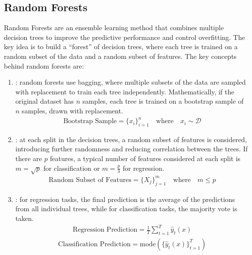 \documentclass[letterpaper,10pt,english]{jupyterBook}
\begin{document}
\subsection{Random Forests}
\label{\detokenize{notebooks/review_ML:random-forests}}
\sphinxAtStartPar
Random Forests are an ensemble learning method that combines multiple decision trees to improve the predictive performance and control overfitting. The key idea is to build a “forest” of decision trees, where each tree is trained on a random subset of the data and a random subset of features. The key concepts behind random forests are:
\begin{enumerate}
%
\item {} 
\sphinxAtStartPar
{}: random forests use bagging, where multiple subsets of the data are sampled with replacement to train each tree independently. Mathematically, if the original dataset has \(n\) samples, each tree is trained on a bootstrap sample of \(n\) samples, drawn with replacement.
\begin{equation*}
\begin{split}
   \text{Bootstrap Sample} = \{ x_i \}_{i=1}^{n} \quad \text{where} \quad x_i \sim \mathcal{D}
   \end{split}
\end{equation*}
\item {} 
\sphinxAtStartPar
{}: at each split in the decision trees, a random subset of features is considered, introducing further randomness and reducing correlation between the trees. If there are \(p\) features, a typical number of features considered at each split is \(m = \sqrt{p}\) for classification or \(m = \frac{p}{3}\) for regression.
\begin{equation*}
\begin{split}
   \text{Random Subset of Features} = \{ X_j \}_{j=1}^{m} \quad \text{where} \quad m \leq p
   \end{split}
\end{equation*}
\item {} 
\sphinxAtStartPar
{}: for regression tasks, the final prediction is the average of the predictions from all individual trees, while for classification tasks, the majority vote is taken.
\begin{equation*}
\begin{split}
   \text{Regression Prediction} = \frac{1}{T} \sum_{t=1}^{T} \hat{y}_t(x)
   \end{split}
\end{equation*}\begin{equation*}
\begin{split}
   \text{Classification Prediction} = \text{mode}\left(\{ \hat{y}_t(x) \}_{t=1}^{T} \right)
   \end{split}
\end{equation*}
\end{enumerate}
\end{document}
